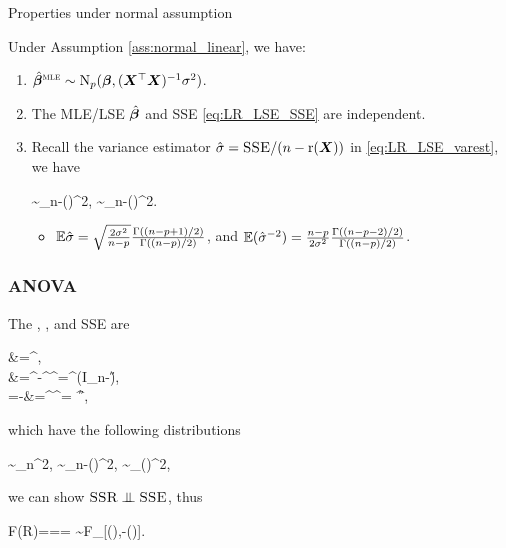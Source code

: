 \documentclass[10pt,a4paper]{book}
\begin{document}
\begin{thmbox}{Properties under normal assumption}
	\begin{proposition}\label{prop:LR_full_rank_normal_prop} Under Assumption \ref{ass:normal_linear}, we have:
		\begin{enumerate}
			\item $\hat{{\boldsymbol\beta}}^{\textsc{mle}}\sim\mathrm{N}_p({\boldsymbol\beta},({\boldsymbol X}^\top{\boldsymbol X})^{-1}\sigma^2)$. 
			\item The MLE/LSE $\hat{{\boldsymbol\beta}}$ and SSE \eqref{eq:LR_LSE_SSE} are independent.
			\item Recall the variance estimator $\hat{\sigma}=\textsc{SSE}/(n-\mathrm{r}({\boldsymbol X}))$ in \eqref{eq:LR_LSE_varest}, we have \begin{salign*}
				\sim\chi_{n-\rmr(\X)}^2, \quad {} \quad {}\sim\chi_{n-\rmr(\X)}^2.
			\end{salign*}
			\begin{itemize}
				\item $\mathbb E\hat{\sigma}=\sqrt{\frac{2\sigma^2}{n-p}}\frac{\Gamma((n-p+1)/2)}{\Gamma((n-p)/2)}$, and $\mathbb E(\hat{\sigma}^{-2})=\frac{n-p}{2\sigma^2}\frac{\Gamma((n-p-2)/2)}{\Gamma((n-p)/2)}$.
			\end{itemize}
		\end{enumerate}
	\end{proposition}
\end{thmbox}

\subsubsection{ANOVA}\label{sec:LR_full_rank_normal_ANOVA}

The , , and SSE are 
\begin{salign*}
	\SST&=\Y^\TT\Y,\\
	\SSE&=\Y^\TT\Y-\hat{\bab}^\TT\X^\TT\Y=\Y^\TT (I_n-\H)\Y,\\
	\SSR=\SST-\SSE&=\hat{\bab}^\TT\X^\TT\Y= \Y^\TT\H\Y,
\end{salign*}
which have the following distributions
\begin{salign*}
	\sim\chi_{n}^2, \quad 
	\sim\chi_{n-\rmr(\X)}^2, \quad
	\sim\chi_{\rmr(\X)}^2, 
\end{salign*}
we can show $\SSR\indep\SSE$, thus
\begin{salign*}
	F(R)=\frac{\MSR}{\MSE}== \sim \textsc{F}_{[\rmr(\X),\n-\rmr(\X)]}.
\end{salign*}
\end{document}
